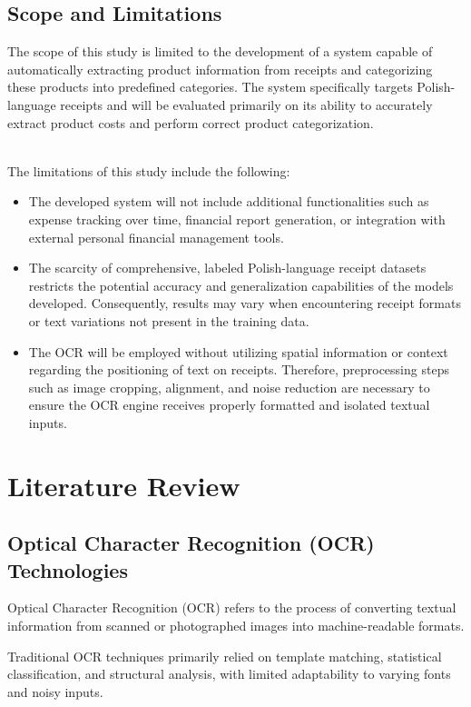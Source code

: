 \documentclass{SGGW-thesis-EN}
\begin{document}
\section{Scope and Limitations}

The scope of this study is limited to the development of a system capable of automatically extracting product information from receipts and categorizing these products into predefined categories. 
The system specifically targets Polish-language receipts and will be evaluated primarily on its ability to accurately extract product costs and perform correct product categorization.

\noindent \\The limitations of this study include the following:

\begin{itemize}
    \item The developed system will not include additional functionalities such as expense tracking over time, financial report generation, or integration with external personal financial management tools.
    \item The scarcity of comprehensive, labeled Polish-language receipt datasets restricts the potential accuracy and generalization capabilities of the models developed. Consequently, results may vary when encountering receipt formats or text variations not present in the training data.
    \item The OCR will be employed without utilizing spatial information or context regarding the positioning of text on receipts. Therefore, preprocessing steps such as image cropping, alignment, and noise reduction are necessary to ensure the OCR engine receives properly formatted and isolated textual inputs.
\end{itemize}

\chapter{Literature Review}

\section{Optical Character Recognition (OCR) Technologies}
Optical Character Recognition (OCR) refers to the process of converting textual information from scanned or photographed images into machine-readable formats. 

Traditional OCR techniques primarily relied on template matching, statistical classification, and structural analysis, with limited adaptability to varying fonts and noisy inputs.\cite{ocrsystems}
\end{document}
